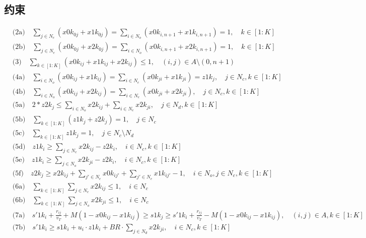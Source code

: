 \documentclass[11pt]{ctexart}
\begin{document}
\subsection*{约束}
\begin{align*}
&\text{(2a)} \quad \sum_{j \in N_e} (x0k_{0j} + x1k_{0j}) = \sum_{i \in N_o} (x0k_{i,n+1} + x1k_{i,n+1}) = 1, \quad k \in [1 : K] \\
&\text{(2b)} \quad \sum_{j \in N_e} (x0k_{0j} + x2k_{0j}) = \sum_{i \in N_o} (x0k_{i,n+1} + x2k_{i,n+1}) = 1, \quad k \in [1 : K] \\
&\text{(3)} \quad \sum_{k \in [1:K]} (x0k_{ij} + x1k_{ij} + x2k_{ij}) \leq 1, \quad (i, j) \in A \setminus (0, n + 1) \\
&\text{(4a)} \quad \sum_{i \in N_o} (x0k_{ij} + x1k_{ij}) = \sum_{i \in N_e} (x0k_{ji} + x1k_{ji}) = z1k_j, \quad j \in N_c, k \in [1 : K] \\
&\text{(4b)} \quad \sum_{i \in N_o} (x0k_{ij} + x2k_{ij}) = \sum_{i \in N_e} (x0k_{ji} + x2k_{ji}), \quad j \in N_c, k \in [1 : K] \\
&\text{(5a)} \quad 2 * z2k_j \leq \sum_{i \in N_o} x2k_{ij} + \sum_{i \in N_e} x2k_{ji}, \quad j \in N_d, k \in [1 : K] \\
&\text{(5b)} \quad \sum_{k \in [1:K]} (z1k_j + z2k_j) = 1, \quad j \in N_c \\
&\text{(5c)} \quad \sum_{k \in [1:K]} z1k_j = 1, \quad j \in N_c\setminus N_d \\
&\text{(5d)} \quad z1k_i \geq \sum_{j \in N_e} x2k_{ij} - z2k_i, \quad i \in N_c, k \in [1 : K] \\
&\text{(5e)} \quad z1k_i \geq \sum_{j \in N_o} x2k_{ji} - z2k_i, \quad i \in N_c, k \in [1 : K] \\
&\text{(5f)} \quad z2k_j \geq x2k_{ij} + \sum_{j' \in N_e} x0k_{ij'} + \sum_{j' \in N_e} x1k_{ij'} - 1, \quad i \in N_o, j \in N_c, k \in [1 : K] \\
&\text{(6a)} \quad \sum_{k \in [1:K]} \sum_{j \in N_e} x2k_{ij} \leq 1, \quad i \in N_c \\
&\text{(6b)} \quad \sum_{k \in [1:K]} \sum_{j \in N_o} x2k_{ji} \leq 1, \quad i \in N_c \\
&\text{(7a)} \quad s'1k_i + \frac{r_{ij}}{v_T} + M(1 - x0k_{ij} - x1k_{ij}) \geq s1k_j \geq s'1k_i + \frac{r_{ij}}{v_T} - M(1 - x0k_{ij} - x1k_{ij}), \quad (i, j) \in A, k \in [1 : K] \\
&\text{(7b)} \quad s'1k_i \geq s1k_i + u_i \cdot z1k_i + BR \cdot \sum_{j \in N_d} x2k_{ji}, \quad i \in N_c, k \in [1 : K] \\

\end{align*}
\end{document}

